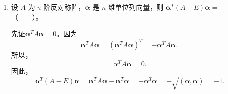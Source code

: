 \begin{enumerate}[1~]
\begin{enumerate}[1.~]
\begin{solution}
\[\begin{array}{c}
	\cdots\\
	\cdots\\
	\cdots\\
	\\
	\cdots\\
	\cdots\\
\end{array}\begin{array}{c}
	0\\
	0\\
	0\\
	\vdots\\
	\frac52\\
	1\\
\end{array}\begin{array}{c}
	0\\
	0\\
	0\\
	\vdots\\
	\frac32\\
	\frac52\\
\end{array} \right|
,\]
对于上述命题取$a=1,b=\frac32$，即得\[
D=2^n \frac{1-( \frac32)^{n+1}}{1-\frac32} = 3^{n+1}-2^{n+1}.
\]
\end{solution}

\item
设 $A$ 为 $n$ 阶反对称阵，$\boldsymbol{\alpha}$ 是 $n$ 维单位列向量，则 $\boldsymbol{\alpha}^T (A - E)\boldsymbol{\alpha} = $（\ \ \ \ ）。
\begin{solution}
先证$ \boldsymbol{\alpha} ^T A \boldsymbol{\alpha} = 0$。因为\[
\boldsymbol{\alpha} ^T A \boldsymbol{\alpha} = (\boldsymbol{\alpha} ^T A \boldsymbol{\alpha})^T = -\boldsymbol{\alpha} ^T A \boldsymbol{\alpha},
\]
所以，\[
\boldsymbol{\alpha} ^T A \boldsymbol{\alpha} = 0.
\]
因此，\[
\boldsymbol{\alpha} ^T (A-E) \boldsymbol{\alpha} = \boldsymbol{\alpha} ^T A \boldsymbol{\alpha} - \boldsymbol{\alpha} ^T \boldsymbol{\alpha} = - \boldsymbol{\alpha} ^T \boldsymbol{\alpha} = - \sqrt{(\boldsymbol{\alpha},\boldsymbol{\alpha})} = -1.
\]
\end{solution}


\end{enumerate}
\end{enumerate}
